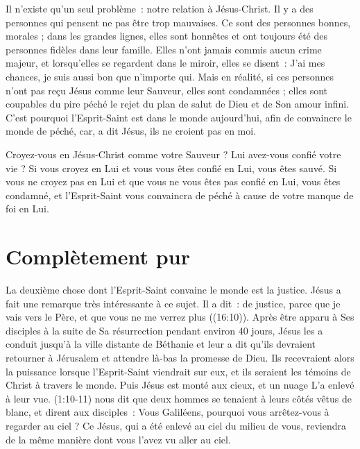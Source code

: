 Il n'existe qu'un seul problème~: notre relation à Jésus-Christ.
 Il y a des personnes qui pensent ne pas être trop mauvaises.
 Ce sont des personnes bonnes, morales ; dans les grandes lignes,
 elles sont honnêtes et ont toujours été des personnes fidèles
 dans leur famille. Elles n'ont jamais commis aucun crime majeur,
 et lorsqu'elles se regardent dans le miroir, elles se disent~:
 \og  J'ai mes chances, je suis aussi bon que n'importe qui. \fg{}
 Mais en réalité, si ces personnes n'ont pas reçu Jésus comme leur Sauveur,
 elles sont condamnées ; elles sont coupables du pire péché
 \ocadr le rejet du plan de salut de Dieu et de Son amour infini.
 C'est pourquoi l'Esprit-Saint est dans le monde aujourd'hui,
 afin de convaincre le monde de péché,
 \og car, a dit Jésus, ils ne croient pas en moi. \fg{}

Croyez-vous en Jésus-Christ comme votre Sauveur ?
 Lui avez-vous confié votre vie ? Si vous croyez en Lui et vous vous êtes
 confié en Lui, vous êtes sauvé.
 Si vous ne croyez pas en Lui et que vous ne vous êtes pas confié en Lui,
 vous êtes condamné, et l'Esprit-Saint vous convaincra de péché
 à cause de votre manque de foi en Lui.

\section*{Complètement pur}

La deuxième chose dont l'Esprit-Saint convainc le monde est la justice.
 Jésus a fait une remarque très intéressante à ce sujet. Il a dit~:
 \og de justice, parce que je vais vers le Père,
 et que vous ne me verrez plus \fg{} ((16:10)).
 Après être apparu à Ses disciples à la suite de Sa résurrection
 pendant environ 40 jours, Jésus les a conduit jusqu'à la ville distante
 de Béthanie et leur a dit qu'ils devraient retourner à Jérusalem
 et attendre là-bas la promesse de Dieu.
 Ils recevraient alors la puissance lorsque l'Esprit-Saint viendrait sur eux,
 et ils seraient les témoins de Christ à travers le monde.
 Puis Jésus est monté aux cieux, et un nuage L'a enlevé à leur vue.
 (1:10-11) nous dit que deux hommes se tenaient à leurs côtés
 vêtus de blanc, et dirent aux disciples~:
 \og Vous Galiléens, pourquoi vous arrêtez-vous à regarder au ciel ?
 Ce Jésus, qui a été enlevé au ciel du milieu de vous,
 reviendra de la même manière dont vous l'avez vu aller au ciel. \fg{}

